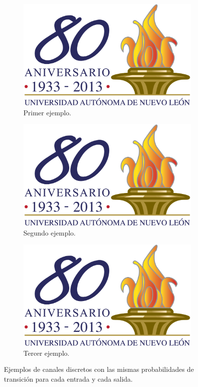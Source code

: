 \begin{figure}
  \centering
  \begin{subfigure}[b]{0.4\textwidth}
    \centering
    \includegraphics[width=\textwidth]{ejemplo.png}
    \caption{Primer ejemplo.}
    \label{fig12a}
  \end{subfigure}%
\quad
  \centering
  \begin{subfigure}[b]{0.4\textwidth}
    \centering
    \includegraphics[width=\textwidth]{ejemplo.png}
    \caption{Segundo ejemplo.}
    \label{fig12b}
  \end{subfigure}%
\quad
  \centering
  \begin{subfigure}[b]{0.4\textwidth}
    \centering
    \includegraphics[width=\textwidth]{ejemplo.png}
    \caption{Tercer ejemplo.}
    \label{fig12c}
  \end{subfigure}%
\caption{Ejemplos de canales discretos con las mismas probabilidades de
 transici\'{o}n para cada entrada y cada salida.}
\label{fig:12}
\end{figure}

